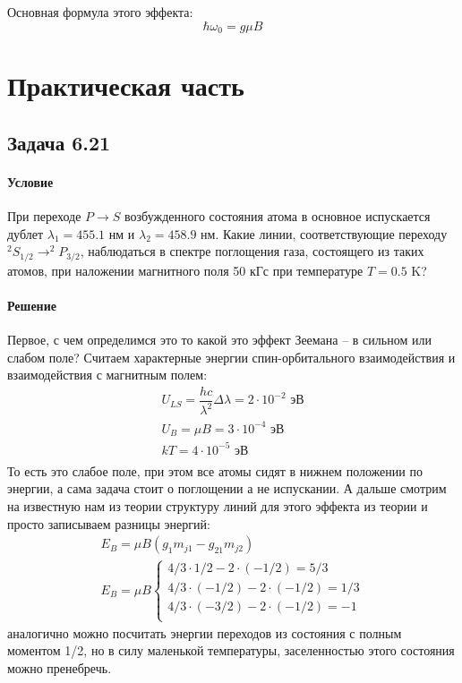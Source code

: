 \documentclass[12pt]{article}
\begin{document}
Основная формула этого эффекта:
\begin{equation*}
    \hbar \omega_0 = g\mu B
\end{equation*}




\section{Практическая часть}
\subsection{Задача 6.21}
\label{task_6.21}
\paragraph{Условие} При переходе $P \rightarrow S$ возбужденного состояния атома в основное испускается дублет $\lambda_1 = 455.1$ нм и $\lambda_2 = 458.9$ нм. Какие линии, соответствующие переходу $^2S_{1/2} \rightarrow ^2P_{3/2}$, наблюдаться в спектре поглощения газа, состоящего из таких атомов, при наложении магнитного поля 50 кГс при температуре $T=0.5$ K?
\paragraph{Решение}
Первое, с чем определимся это то какой это эффект Зеемана -- в сильном или слабом поле? Считаем характерные энергии спин-орбитального взаимодействия и взаимодействия с магнитным полем:
\begin{gather*}
    U_{LS} = \dfrac{hc}{\lambda^2}\Delta \lambda = 2\cdot 10^{-2} \text{ эВ}\\
    U_B = \mu B = 3\cdot 10^{-4} \text{ эВ}\\
    kT = 4\cdot 10^{-5} \text{ эВ}\\
\end{gather*}
То есть это слабое поле, при этом все атомы сидят в нижнем положении по энергии, а сама задача стоит о поглощении а не испускании. А дальше смотрим на известную нам из теории структуру линий для этого эффекта из теории и просто записываем разницы энергий:
\begin{gather*}
    E_B=\mu B(g_1m_{j1} - g_21m_{j2})\\
    E_B = \mu B 
    \begin{cases}
    4/3 \cdot 1/2 - 2\cdot(-1/2) = 5/3\\
    4/3 \cdot (-1/2) - 2\cdot(-1/2) = 1/3\\
    4/3 \cdot (-3/2) - 2\cdot(-1/2) = -1\\
    \end{cases}
\end{gather*}
аналогично можно посчитать энергии переходов из состояния с полным моментом 1/2, но в силу маленькой температуры, заселенностью этого состояния можно пренебречь.
\end{document}
